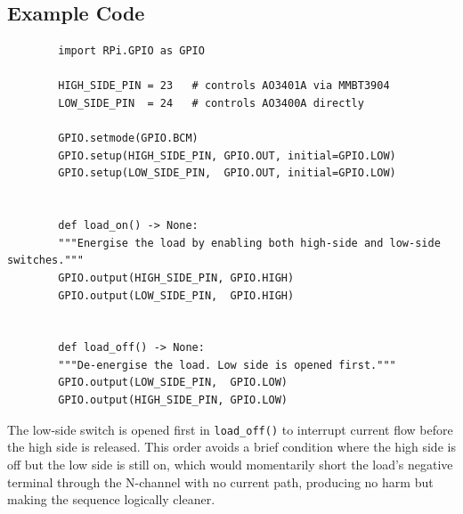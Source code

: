 \documentclass[12pt,letterpaper]{article}
\begin{document}
	\subsection{Example Code}
	
	\begin{verbatim}
		import RPi.GPIO as GPIO
		
		HIGH_SIDE_PIN = 23   # controls AO3401A via MMBT3904
		LOW_SIDE_PIN  = 24   # controls AO3400A directly
		
		GPIO.setmode(GPIO.BCM)
		GPIO.setup(HIGH_SIDE_PIN, GPIO.OUT, initial=GPIO.LOW)
		GPIO.setup(LOW_SIDE_PIN,  GPIO.OUT, initial=GPIO.LOW)
		
		
		def load_on() -> None:
		"""Energise the load by enabling both high-side and low-side switches."""
		GPIO.output(HIGH_SIDE_PIN, GPIO.HIGH)
		GPIO.output(LOW_SIDE_PIN,  GPIO.HIGH)
		
		
		def load_off() -> None:
		"""De-energise the load. Low side is opened first."""
		GPIO.output(LOW_SIDE_PIN,  GPIO.LOW)
		GPIO.output(HIGH_SIDE_PIN, GPIO.LOW)
	\end{verbatim}
	
	\noindent The low-side switch is opened first in \texttt{load\_off()} to interrupt
	current flow before the high side is released. This order avoids a brief condition
	where the high side is off but the low side is still on, which would momentarily
	short the load's negative terminal through the N-channel with no current path,
	producing no harm but making the sequence logically cleaner.
	
	
	
	
	
\end{document}
